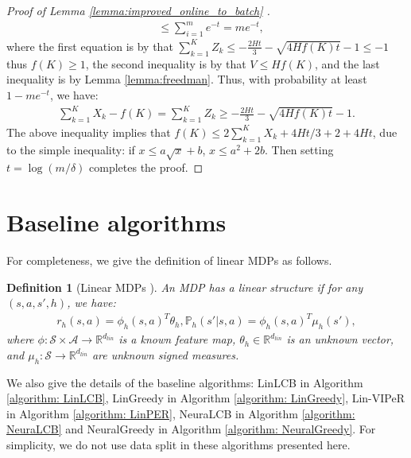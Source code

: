 \documentclass{article} \usepackage{iclr2023/iclr2023_conference,times}
\newtheorem{defn}{Definition}
\begin{document}
\begin{proof}[Proof of Lemma \ref{lemma:improved_online_to_batch} ]
\begin{align*}
&\leq \sum_{i=1}^m e^{-t} = m e^{-t},
\end{align*}
where the first equation is by that $\sum_{k=1}^K Z_k \leq -\frac{2 H t}{3} - \sqrt{ 4 H f(K) t } - 1 \leq -1$ thus $f(K) \geq 1$, the second inequality is by that $V \leq H f(K)$, and the last inequality is by Lemma \ref{lemma:freedman}. Thus, with probability at least $1 - m e^{-t}$, we have:
\begin{align*}
    \sum_{k=1}^K X_k - f(K) = \sum_{k=1}^K Z_k \geq -\frac{2 H t}{3} - \sqrt{ 4 H f(K) t } - 1.
    \label{eq:temp}
\end{align*}
The above inequality implies that $f(K) \leq 2 \sum_{k=1}^K X_k + 4Ht/3 + 2 + 4 Ht $, due to the simple inequality: if $ x \leq a \sqrt{x} + b$, $x \leq a^2 + 2b$. Then setting $t = \log(m/\delta)$ completes the proof. 
\end{proof}
 \section{Baseline algorithms}
\label{section: baseline algorithms}
For completeness, we give the definition of linear MDPs as follows.
\begin{defn}[Linear MDPs \citep{yang2019sample,jin2020provably}]
An MDP has a linear structure if for any $(s,a,s',h)$, we have: 
\begin{align*}
    r_h(s,a) = \phi_h(s,a)^T \theta_h, \mathbb{P}_h(s'|s,a) = \phi_h(s,a)^T \mu_h(s'),
\end{align*}
where $\phi: \mathcal{S} \times \mathcal{A} \rightarrow \mathbb{R}^{d_{lin}}$ is a known feature map, $\theta_h \in \mathbb{R}^{d_{lin}}$ is an unknown vector, and $\mu_h: \mathcal{S} \rightarrow \mathbb{R}^{d_{lin}}$ are unknown signed measures. 
\label{definition:linear_mdp}
\end{defn}

We also give the details of the baseline algorithms: LinLCB in Algorithm \ref{algorithm: LinLCB}, LinGreedy in Algorithm \ref{algorithm: LinGreedy}, Lin-VIPeR in Algorithm \ref{algorithm: LinPER}, NeuraLCB in Algorithm \ref{algorithm: NeuraLCB} and NeuralGreedy in Algorithm \ref{algorithm: NeuralGreedy}. For simplicity, we do not use data split in these algorithms presented here.  
\end{document}

